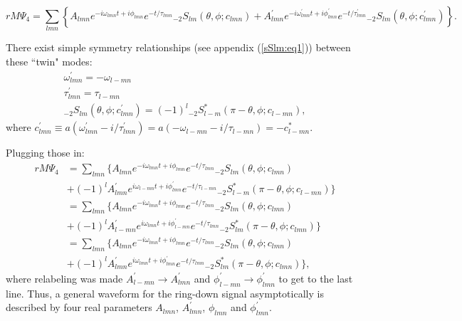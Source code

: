 \documentclass[11pt]{article}
\begin{document}
\begin{equation}
rM\Psi_4 = \sum_{lmn} \left\{ A_{lmn} e^{-i\omega_{lmn}t+i\phi_{lmn}}e^{-t/\tau_{lmn}} {}_{\minus 2}S_{lm}(\theta,\phi ; c_{lmn}) + A^{'}_{lmn} e^{-i\omega^{'}_{lmn}t+i\phi^{'}_{lmn}}e^{-t/\tau^{'}_{lmn}} {}_{\minus 2}S_{lm}(\theta,\phi ; c^{'}_{lmn}) \right\}.
\end{equation}

\noindent
There exist simple symmetry relationships (see appendix (\ref{sSlm:eq1})) between these ``twin" modes:
\begin{equation}
\begin{array}{l}
\omega^{'}_{lmn} = -\omega_{l-mn} \\
\tau^{'}_{lmn} = \tau_{l-mn} \\
{}_{\minus 2}S_{lm}(\theta,\phi ;c^{'}_{lmn}) = (-1)^l {}_{\minus 2}S^{*}_{l-m}(\pi-\theta,\phi; c_{l-mn}),
\end{array} 
\end{equation}
where $c^{'}_{lmn} \equiv a( \omega^{'}_{lmn} - i/\tau^{'}_{lmn} ) = a( -\omega_{l-mn} - i/\tau_{l-mn} ) = -c^{*}_{l-mn}$.

\noindent
Plugging those in:
\begin{align} \label{ringdowneq}
\nonumber rM\Psi_4 &= \sum_{lmn} \Big\{ A_{lmn} e^{-i\omega_{lmn}t+i\phi_{lmn}}e^{-t/\tau_{lmn}} {}_{\minus 2}S_{lm}(\theta,\phi; c_{lmn})\\
\nonumber & + (-1)^l A^{'}_{lmn} e^{i\omega_{l-mn}t+i\phi^{'}_{lmn}}e^{-t/\tau_{l-mn}} {}_{\minus 2}S^{*}_{l-m}(\pi-\theta,\phi; c_{l-mn}) \Big\}\\
\nonumber &=\sum_{lmn} \Big\{ A_{lmn} e^{-i\omega_{lmn}t+i\phi_{lmn}}e^{-t/\tau_{lmn}} {}_{\minus 2}S_{lm}(\theta, \phi ;c_{lmn})\\
\nonumber & + (-1)^l A^{'}_{l-mn} e^{i\omega_{lmn}t+i\phi^{'}_{l-mn}}e^{-t/\tau_{lmn}} {}_{\minus 2}S^{*}_{lm}(\pi-\theta, \phi; c_{lmn}) \Big\}\\
\nonumber &=\sum_{lmn} \Bigg\{ A_{lmn} e^{-i\omega_{lmn}t+i\phi_{lmn}}e^{-t/\tau_{lmn}} {}_{\minus 2}S_{lm}(\theta, \phi ;c_{lmn}) \\
 & + (-1)^l A^{'}_{lmn} e^{i\omega_{lmn}t+i\phi^{'}_{lmn}}e^{-t/\tau_{lmn}} {}_{\minus 2}S^{*}_{lm 	}(\pi-\theta, \phi; c_{lmn}) \Big\},
\end{align}
where relabeling was made $A^{'}_{l-mn} \rightarrow A^{'}_{lmn}$ and $\phi^{'}_{l-mn} \rightarrow \phi^{'}_{lmn}$ to get to the last line. Thus, a general waveform for the ring-down signal asymptotically is described by four real parameters $A_{lmn}$, $A^{'}_{lmn}$, $\phi_{lmn}$ and $\phi^{'}_{lmn}$.
\end{document}
